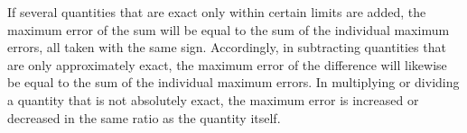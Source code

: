 If several quantities that are exact only within certain limits are added, the maximum error of the sum will be equal to the sum of the individual maximum errors, all taken with the same sign. Accordingly, in subtracting quantities that are only approximately exact, the maximum error of the difference will likewise be equal to the sum of the individual maximum errors. In multiplying or dividing a quantity that is not absolutely exact, the maximum error is increased or decreased in the same ratio as the quantity itself.
